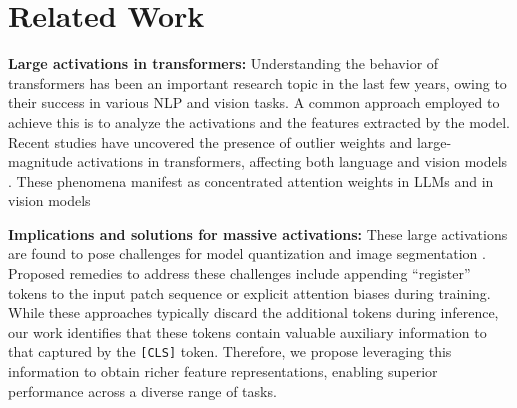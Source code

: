 \section{Related Work}
\noindent\textbf{Large activations in transformers:} 
Understanding the behavior of transformers has been an important research topic in the last few years, owing to their success in various NLP and vision tasks. A common approach employed to achieve this is to analyze the activations and the features extracted by the model. Recent studies have uncovered the presence of outlier weights and large-magnitude activations in transformers, affecting both language \cite{heimersheim2023residual,kovaleva2021bert,zhao2023unveiling,timkey2021all} and vision models \cite{darcet2024vision,mambaregisters}. These phenomena manifest as concentrated attention weights in LLMs \cite{kovaleva2021bert,zhao2023unveiling} and in vision models~\cite{darcet2024vision}

\noindent\textbf{Implications and solutions for massive activations:} These large activations are found to pose challenges for model quantization \cite{dettmers2022gptint,he2024understanding} and image segmentation \cite{darcet2024vision}. Proposed remedies to address these challenges include appending ``register'' tokens to the input patch sequence \cite{darcet2024vision} or explicit attention biases \cite{sun2024massive} during training. While these approaches typically discard the additional tokens during inference, our work identifies that these tokens contain valuable auxiliary information to that captured by the \texttt{[CLS]} token. Therefore, we propose leveraging this information to obtain richer feature representations, enabling superior performance across a diverse range of tasks.




